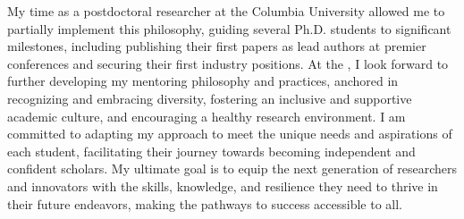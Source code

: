 My time as a postdoctoral researcher at the Columbia University allowed me to partially implement this philosophy, guiding several Ph.D. students to significant milestones, including publishing their first papers as lead authors at premier conferences and securing their first industry positions. At the \appSchool{}, I look forward to further developing my mentoring philosophy and practices, anchored in recognizing and embracing diversity, fostering an inclusive and supportive academic culture, and encouraging a healthy research environment. I am committed to adapting my approach to meet the unique needs and aspirations of each student, facilitating their journey towards becoming independent and confident scholars. My ultimate goal is to equip the next generation of researchers and innovators with the skills, knowledge, and resilience they need to thrive in their future endeavors, making the pathways to success accessible to all.







